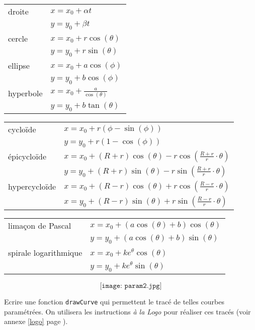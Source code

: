 \begin{td}
{\small
\noindent\begin{tabular}[t]{|ll|}
\hline
droite & $x = x_0 + \alpha t$\\
       & $y = y_0 + \beta t$\\
\hline
cercle & $x = x_0 + r\cos(\theta)$\\
       & $y = y_0 + r\sin(\theta)$\\
\hline
ellipse & $x = x_0 + a\cos(\phi)$\\
        & $y = y_0 + b\cos(\phi)$ \\
\hline
hyperbole & $\displaystyle x = x_0 + \frac{a}{\cos(\theta)}$ \\
          & $ y = y_0 + b \tan(\theta)$\\
\hline
\end{tabular}
\hfill
\begin{tabular}[t]{|ll|}
\hline
cycloïde & $x = x_0 + r(\phi - \sin(\phi))$\\
       & $y = y_0 + r(1 - \cos(\phi))$\\
\hline
épicycloïde & $\displaystyle x = x_0 + (R+r)\cos(\theta) - r\cos\left(\frac{R+r}{r}\cdot\theta\right)$\\
       & $\displaystyle y = y_0 + (R+r)\sin(\theta) - r\sin\left(\frac{R+r}{r}\cdot\theta\right)$\\
\hline
hypercycloïde & $\displaystyle x = x_0 + (R-r)\cos(\theta) + r\cos\left(\frac{R-r}{r}\cdot\theta\right)$\\
        & $\displaystyle x = y_0 + (R-r)\sin(\theta) + r\sin\left(\frac{R-r}{r}\cdot\theta\right)$ \\
\hline
\end{tabular}
\hfill
\begin{tabular}[t]{|ll|}
\hline
limaçon de Pascal & $x = x_0 + (a\cos(\theta) + b)\cos(\theta)$\\
                  & $y = y_0 + (a\cos(\theta) + b)\sin(\theta)$\\
\hline
spirale logarithmique & $\displaystyle x = x_0 + ke^\theta\cos(\theta)$\\
                      & $\displaystyle y = y_0 + ke^\theta\sin(\theta)$\\
\hline
\end{tabular}
}


$$\texttt{[image: param2.jpg]}$$



Ecrire une fonction {\tt drawCurve} qui permettent le tracé de telles courbes paramétrées.
On utilisera les instructions {\em à la {\sc Logo}} pour réaliser ces tracés
(voir annexe \ref{logo} page \pageref{logo}).
\end{td}


